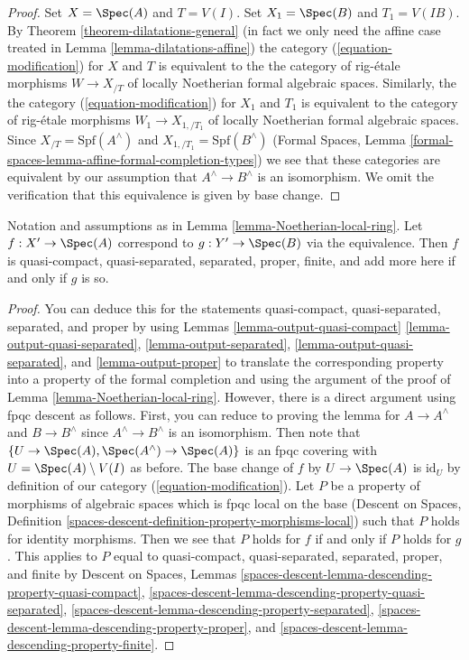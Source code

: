 \begin{proof}
Set $X = \Spec(A)$ and $T = V(I)$.
Set $X_1 = \Spec(B)$ and $T_1 = V(IB)$.
By Theorem \ref{theorem-dilatations-general} (in fact we only need
the affine case treated in Lemma \ref{lemma-dilatations-affine})
the category (\ref{equation-modification}) for $X$ and $T$
is equivalent to the the category of rig-\'etale morphisms
$W \to X_{/T}$ of locally Noetherian formal algebraic spaces.
Similarly, the the category (\ref{equation-modification})
for $X_1$ and $T_1$ is equivalent to the category of rig-\'etale
morphisms $W_1 \to X_{1, /T_1}$ of locally Noetherian formal
algebraic spaces. Since $X_{/T} = \text{Spf}(A^\wedge)$
and $X_{1, /T_1} = \text{Spf}(B^\wedge)$ (Formal Spaces, Lemma
\ref{formal-spaces-lemma-affine-formal-completion-types}) we see that
these categories are equivalent by our assumption that
$A^\wedge \to B^\wedge$ is an isomorphism. We omit the verification
that this equivalence is given by base change.
\end{proof}

\begin{lemma}
\label{lemma-Noetherian-local-ring-properties}
Notation and assumptions as in Lemma \ref{lemma-Noetherian-local-ring}.
Let $f : X' \to \Spec(A)$ correspond to $g : Y' \to \Spec(B)$
via the equivalence. Then $f$ is quasi-compact, quasi-separated, separated,
proper, finite, and add more here if and only if $g$ is so.
\end{lemma}

\begin{proof}
You can deduce this for the statements
quasi-compact, quasi-separated, separated, and proper
by using Lemmas \ref{lemma-output-quasi-compact}
\ref{lemma-output-quasi-separated},
\ref{lemma-output-separated},
\ref{lemma-output-quasi-separated}, and
\ref{lemma-output-proper}
to translate the corresponding property into a property
of the formal completion and using the argument of the proof
of Lemma \ref{lemma-Noetherian-local-ring}.
However, there is a direct argument using fpqc descent as follows.
First, you can reduce to proving the lemma for $A \to A^\wedge$
and $B \to B^\wedge$ since $A^\wedge  \to B^\wedge$ is an isomorphism.
Then note that $\{U \to \Spec(A), \Spec(A^\wedge) \to \Spec(A)\}$ is an
fpqc covering with $U = \Spec(A) \setminus V(I)$ as before.
The base change of $f$ by $U \to \Spec(A)$ is $\text{id}_U$
by definition of our category (\ref{equation-modification}).
Let $P$ be a property of morphisms of algebraic spaces which
is fpqc local on the base (Descent on Spaces, Definition
\ref{spaces-descent-definition-property-morphisms-local})
such that $P$ holds for identity morphisms.
Then we see that $P$ holds for $f$ if and only if $P$ holds for $g$.
This applies to $P$ equal to
quasi-compact, quasi-separated, separated, proper, and finite
by
Descent on Spaces, Lemmas
\ref{spaces-descent-lemma-descending-property-quasi-compact},
\ref{spaces-descent-lemma-descending-property-quasi-separated},
\ref{spaces-descent-lemma-descending-property-separated},
\ref{spaces-descent-lemma-descending-property-proper}, and
\ref{spaces-descent-lemma-descending-property-finite}.
\end{proof}

